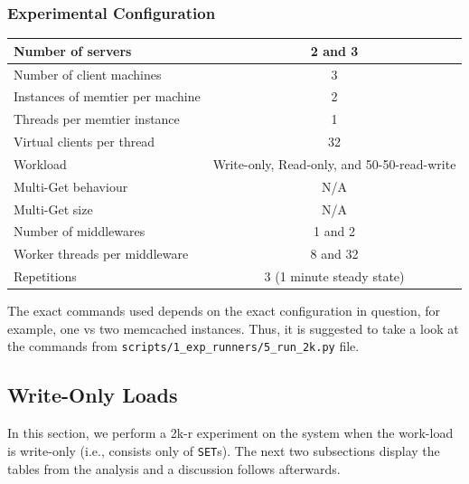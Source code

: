 \documentclass[11pt,a4paper]{article}
\begin{document}
\subsubsection{Experimental Configuration}
\begin{center}
	\scriptsize{
		\begin{tabular}{|l|c|}
			\hline Number of servers                & 2 and 3                                     \\ 
			\hline Number of client machines        & 3                                           \\ 
			\hline Instances of memtier per machine & 2                                           \\ 
			\hline Threads per memtier instance     & 1                                           \\
			\hline Virtual clients per thread       & 32                                     \\ 
			\hline Workload                         & Write-only, Read-only, and 50-50-read-write \\
			\hline Multi-Get behaviour               & N/A                                         \\
			\hline Multi-Get size                   & N/A                                         \\
			\hline Number of middlewares            & 1 and 2                                     \\
			\hline Worker threads per middleware    & 8 and 32                                    \\
			\hline Repetitions                      & 3 (1 minute steady state)                   \\ 
			\hline 
		\end{tabular}
	} 
\end{center}
 The exact commands used depends on the exact configuration in question, for example, one vs two memcached instances. Thus, it is suggested to take a look at the commands from \texttt{scripts/1\_exp\_runners/5\_run\_2k.py} file.

\subsection{Write-Only Loads}
In this section, we perform a 2k-r experiment on the system when the work-load is write-only (i.e., consists only of \texttt{SET}s). 
The next two subsections display the tables from the analysis and a discussion follows afterwards.
\end{document}

